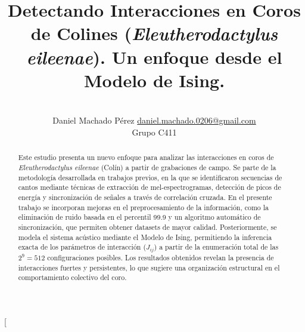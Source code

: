 \documentclass[a4paper,10pt,twocolumn]{article}
\title{Detectando Interacciones en Coros de Colines (\textit{Eleutherodactylus eileenae}). Un enfoque desde el Modelo de Ising.}
\author{\\
\name Daniel Machado Pérez \email \href{mailto:daniel.machado.0206@gmail.com}{daniel.machado.0206@gmail.com}
	\\ \addr Grupo C411}
\begin{document}
\twocolumn[

\maketitle


\begin{abstract}

	Este estudio presenta un nuevo enfoque para analizar 
	las interacciones en coros de \emph{Eleutherodactylus 
	eileenae} (Colín) a partir de grabaciones de campo. 
	Se parte de la metodología desarrollada en trabajos previos, 
	en la que se identificaron secuencias de cantos mediante 
	técnicas de extracción de mel-espectrogramas, detección de 
	picos de energía y sincronización de señales a través de 
	correlación cruzada. En el presente trabajo se incorporan 
	mejoras en el preprocesamiento de la información, como la 
	eliminación de ruido basada en el percentil 99.9 y un 
	algoritmo automático de sincronización, que permiten 
	obtener datasets de mayor calidad. Posteriormente, 
	se modela el sistema acústico mediante el Modelo de Ising, 
	permitiendo la inferencia exacta de los parámetros de 
	interacción (\( J_{ij} \)) a partir de 
	la enumeración total de las \(2^9 = 512\) configuraciones 
	posibles. Los resultados obtenidos revelan la presencia de 
	interacciones fuertes y persistentes, lo que sugiere una 
	organización estructural en el comportamiento colectivo del 
	coro. 


\end{abstract}

\vspace{0.5cm}
\end{document}
